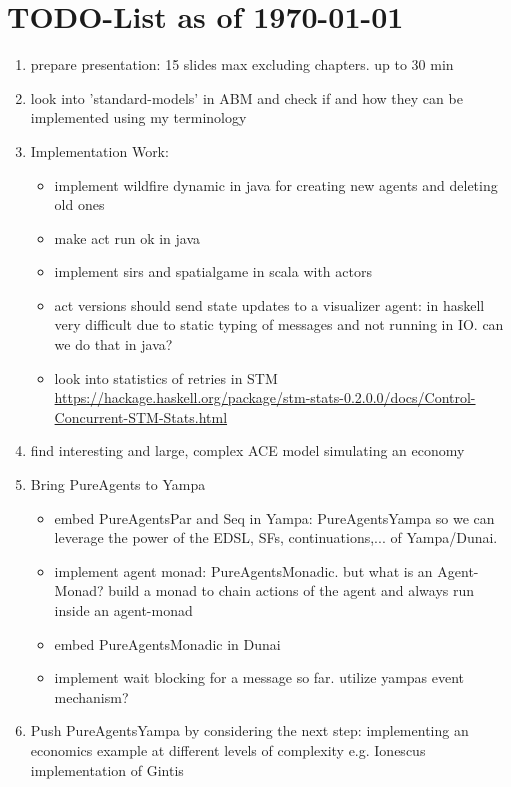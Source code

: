 \section{TODO-List as of \today}

\begin{enumerate}

\item prepare presentation: 15 slides max excluding chapters. up to 30 min

\item look into 'standard-models' in ABM and check if and how they can be implemented using my terminology

\item Implementation Work:
	\begin{itemize}
		\item implement wildfire dynamic in java for creating new agents and deleting old ones
		\item make act run ok in java
		\item implement sirs and spatialgame in scala with actors
		\item act versions should send state updates to a visualizer agent: in haskell very difficult due to static typing of messages and not running in IO. can we do that in java?
		\item look into statistics of retries in STM \url{https://hackage.haskell.org/package/stm-stats-0.2.0.0/docs/Control-Concurrent-STM-Stats.html}
	\end{itemize}

\item find interesting and large, complex ACE model simulating an economy

\item Bring PureAgents to Yampa
	\begin{itemize}
		\item embed PureAgentsPar and Seq in Yampa: PureAgentsYampa so we can leverage the power of the EDSL, SFs, continuations,... of Yampa/Dunai.
		\item implement agent monad: PureAgentsMonadic. but what is an Agent-Monad? build a monad to chain actions of the agent and always run inside an agent-monad
		\item embed PureAgentsMonadic in Dunai
		\item implement wait blocking for a message so far. utilize yampas event mechanism?
	\end{itemize}
	
\item Push PureAgentsYampa by considering the next step: implementing an economics example at different levels of complexity e.g. Ionescus implementation of Gintis


\end{enumerate}
